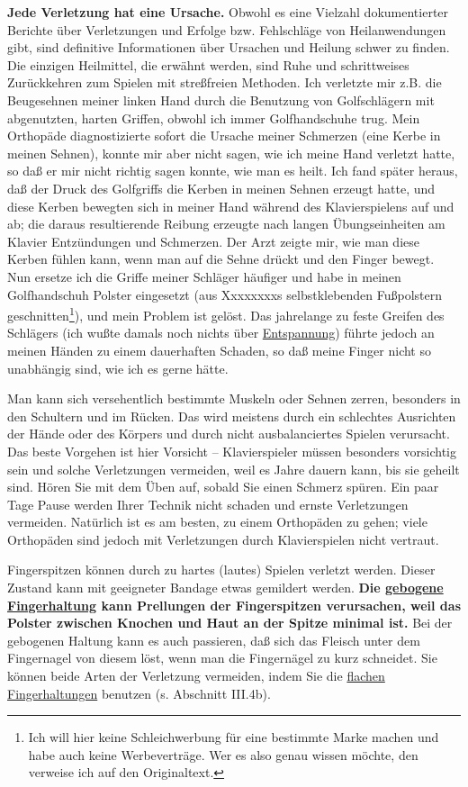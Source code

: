 \textbf{Jede Verletzung hat eine Ursache.}
Obwohl es eine Vielzahl dokumentierter Berichte über Verletzungen und Erfolge bzw. Fehlschläge von Heilanwendungen gibt, sind definitive Informationen über Ursachen und Heilung schwer zu finden.
Die einzigen Heilmittel, die erwähnt werden, sind Ruhe und schrittweises Zurückkehren zum Spielen mit streßfreien Methoden.
Ich verletzte mir z.B. die Beugesehnen meiner linken Hand durch die Benutzung von Golfschlägern mit abgenutzten, harten Griffen, obwohl ich immer Golfhandschuhe trug.
Mein Orthopäde diagnostizierte sofort die Ursache meiner Schmerzen (eine Kerbe in meinen Sehnen), konnte mir aber nicht sagen, wie ich meine Hand verletzt hatte, so daß er mir nicht richtig sagen konnte, wie man es heilt.
Ich fand später heraus, daß der Druck des Golfgriffs die Kerben in meinen Sehnen erzeugt hatte, und diese Kerben bewegten sich in meiner Hand während des Klavierspielens auf und ab; die daraus resultierende Reibung erzeugte nach langen Übungseinheiten am Klavier Entzündungen und Schmerzen.
Der Arzt zeigte mir, wie man diese Kerben fühlen kann, wenn man auf die Sehne drückt und den Finger bewegt.
Nun ersetze ich die Griffe meiner Schläger häufiger und habe in meinen Golfhandschuh Polster eingesetzt (aus Xxxxxxxxs selbstklebenden Fußpolstern geschnitten\footnote{Ich will hier keine Schleichwerbung für eine bestimmte Marke machen und habe auch keine Werbeverträge. Wer es also genau wissen möchte, den verweise ich auf den Originaltext.}), und mein Problem ist gelöst.
Das jahrelange zu feste Greifen des Schlägers (ich wußte damals noch nichts über \hyperref[c1ii14]{Entspannung}) führte jedoch an meinen Händen zu einem dauerhaften Schaden, so daß meine Finger nicht so unabhängig sind, wie ich es gerne hätte.

Man kann sich versehentlich bestimmte Muskeln oder Sehnen zerren, besonders in den Schultern und im Rücken.
Das wird meistens durch ein schlechtes Ausrichten der Hände oder des Körpers und durch nicht ausbalanciertes Spielen verursacht.
Das beste Vorgehen ist hier Vorsicht -- Klavierspieler müssen besonders vorsichtig sein und solche Verletzungen vermeiden, weil es Jahre dauern kann, bis sie geheilt sind.
Hören Sie mit dem Üben auf, sobald Sie einen Schmerz spüren.
Ein paar Tage Pause werden Ihrer Technik nicht schaden und ernste Verletzungen vermeiden.
Natürlich ist es am besten, zu einem Orthopäden zu gehen; viele Orthopäden sind jedoch mit Verletzungen durch Klavierspielen nicht vertraut.

Fingerspitzen können durch zu hartes (lautes) Spielen verletzt werden.
Dieser Zustand kann mit geeigneter Bandage etwas gemildert werden.
\textbf{Die \hyperref[c1ii2]{gebogene Fingerhaltung} kann Prellungen der Fingerspitzen verursachen, weil das Polster zwischen Knochen und Haut an der Spitze minimal ist.}
Bei der gebogenen Haltung kann es auch passieren, daß sich das Fleisch unter dem Fingernagel von diesem löst, wenn man die Fingernägel zu kurz schneidet.
Sie können beide Arten der Verletzung vermeiden, indem Sie die \hyperref[c1iii4b]{flachen Fingerhaltungen} benutzen (s. Abschnitt III.4b).

